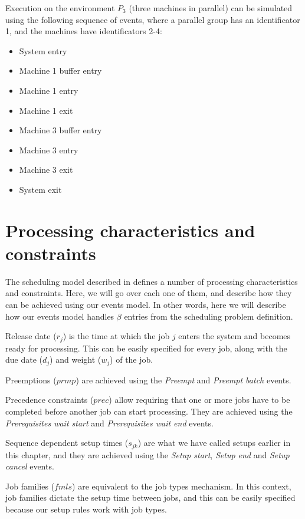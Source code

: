 Execution on the environment $P_3$ (three machines in parallel) can be simulated using the following sequence of events, where a parallel group has an identificator 1, and the machines have identificators 2-4:
\begin{itemize}
    \item System entry
    \item Machine 1 buffer entry
    \item Machine 1 entry
    \item Machine 1 exit
    \item Machine 3 buffer entry
    \item Machine 3 entry
    \item Machine 3 exit
    \item System exit
  \end{itemize}

\section{Processing characteristics and constraints}
\label{sec:processing_characteristics_and_constraints}

The scheduling model described in \citep{pinedo2016scheduling} defines a number of processing characteristics and constraints. Here, we will go over each one of them, and describe how they can be achieved using our events model. In other words, here we will describe how our events model handles $\beta$ entries from the scheduling problem definition.

Release date ($r_j$) is the time at which the job $j$ enters the system and becomes ready for processing. This can be easily specified for every job, along with the due date ($d_j$) and weight ($w_j$) of the job.

Preemptions ($prmp$) are achieved using the \textit{Preempt} and \textit{Preempt batch} events.

Precedence constraints ($prec$) allow requiring that one or more jobs have to be completed before another job can start processing. They are achieved using the \textit{Prerequisites wait start} and \textit{Prerequisites wait end} events.

Sequence dependent setup times ($s_{jk}$) are what we have called setups earlier in this chapter, and they are achieved using the \textit{Setup start}, \textit{Setup end} and \textit{Setup cancel} events.

Job families ($fmls$) are equivalent to the job types mechanism. In this context, job families dictate the setup time between jobs, and this can be easily specified because our setup rules work with job types.

